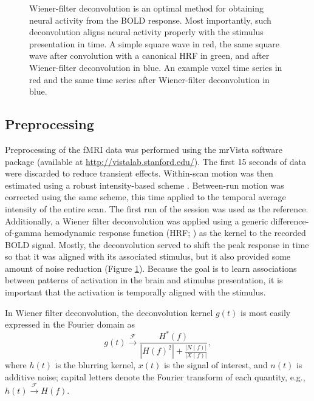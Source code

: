 \documentclass[review,1p,authoryear]{elsarticle}
\begin{document}
\begin{figure}
\begin{subfigure}{0.4\textwidth}
\caption{}
\label{fig:wiener-voxel}
\end{subfigure}
\caption{
Wiener-filter deconvolution is an optimal method for obtaining neural activity from the BOLD response.
Most importantly, such deconvolution aligns neural activity properly with the stimulus presentation in time.
 A simple square wave in red, the same square wave after convolution with a canonical HRF in green, and after Wiener-filter deconvolution in blue. 
 An example voxel time series in red and the same time series after Wiener-filter deconvolution in blue.}
\label{fig:wiener-deconvolution}
\end{figure}

\subsection{Preprocessing}
Preprocessing of the fMRI data was performed using the mrVista software package (available at \url{http://vistalab.stanford.edu/}). 
The first 15 seconds of data  were discarded to reduce transient effects.
Within-scan motion was then estimated using a robust intensity-based scheme \citep{Nestares2000}. 
Between-run motion was corrected using the same scheme, this time applied to the temporal average intensity of the entire scan. 
The first run of the session was used as the reference. 
Additionally, a Wiener filter deconvolution \citep{Poor1980} was applied using a generic difference-of-gamma hemodynamic response function (HRF; \cite{Glover1999}) as the kernel to the recorded BOLD signal.
Mostly, the deconvolution served to shift the peak response in time so that it was aligned with its associated stimulus, but it also provided some amount of noise reduction (Figure \ref{fig:wiener-voxel}).
Because the goal is to learn associations between patterns of activation in the brain and stimulus presentation, it is important that the activation is temporally aligned with the stimulus.

In Wiener filter deconvolution, the deconvolution kernel $g(t)$ is most easily expressed in the Fourier domain as
\begin{equation}
g(t) \xrightarrow{\mathcal{F}} \frac{H^{*}(f)}{\left|H(f)^{2}\right| + \frac{\left| N(f) \right|}{\left| X(f) \right|}},
\end{equation}
where $h(t)$ is the blurring kernel, $x(t)$ is the signal of interest, and $n(t)$ is additive noise; capital letters denote the Fourier transform of each quantity, e.g., $h(t) \xrightarrow{\mathcal{F}} H(f)$.
\end{document}
